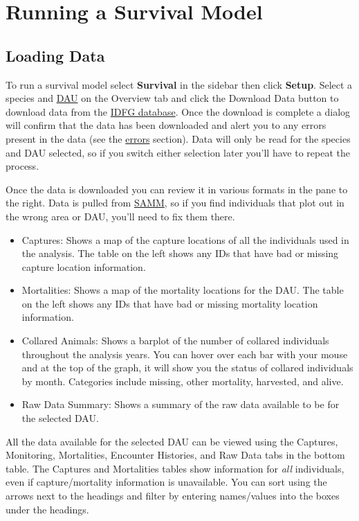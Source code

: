 \documentclass[
]{book}
\providecommand{\tightlist}{%
  \setlength{\itemsep}{0pt}\setlength{\parskip}{0pt}}
\begin{document}
\hypertarget{surv-model}{%
\section{Running a Survival Model}\label{surv-model}}

\hypertarget{surv-load}{%
\subsection{Loading Data}\label{surv-load}}

To run a survival model select \textbf{Survival} in the sidebar then click \textbf{Setup}. Select a species and \protect\hyperlink{gl-dau}{DAU} on the Overview tab and click the {Download Data} button to download data from the \protect\hyperlink{gl-samm}{IDFG database}. Once the download is complete a dialog will confirm that the data has been downloaded and alert you to any errors present in the data (see the \protect\hyperlink{surv-errors}{errors} section). Data will only be read for the species and DAU selected, so if you switch either selection later you'll have to repeat the process.

Once the data is downloaded you can review it in various formats in the pane to the right. Data is pulled from \protect\hyperlink{gl-samm}{SAMM}, so if you find individuals that plot out in the wrong area or DAU, you'll need to fix them there.

\begin{itemize}
\tightlist
\item
  Captures: Shows a map of the capture locations of all the individuals used in the analysis. The table on the left shows any IDs that have bad or missing capture location information.
\item
  Mortalities: Shows a map of the mortality locations for the DAU. The table on the left shows any IDs that have bad or missing mortality location information.
\item
  Collared Animals: Shows a barplot of the number of collared individuals throughout the analysis years. You can hover over each bar with your mouse and at the top of the graph, it will show you the status of collared individuals by month. Categories include missing, other mortality, harvested, and alive.
\item
  Raw Data Summary: Shows a summary of the raw data available to be for the selected DAU.
\end{itemize}

All the data available for the selected DAU can be viewed using the Captures, Monitoring, Mortalities, Encounter Histories, and Raw Data tabs in the bottom table. The Captures and Mortalities tables show information for \emph{all} individuals, even if capture/mortality information is unavailable. You can sort using the arrows next to the headings and filter by entering names/values into the boxes under the headings.
\end{document}
